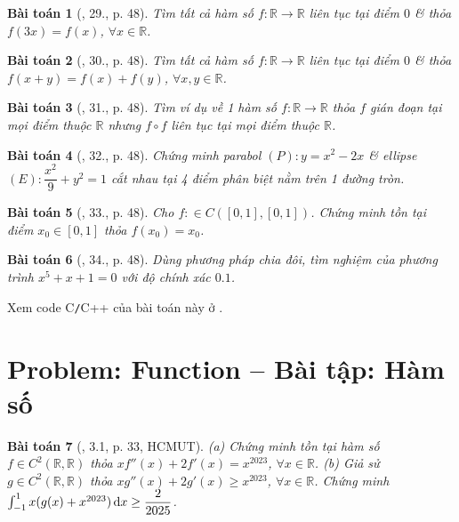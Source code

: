 \documentclass[oneside]{book}
\newtheorem{baitoan}{Bài toán}
\begin{document}
\begin{baitoan}[\cite{TLCT_BT_dai_so_giai_tich_11}, 29., p. 48]
	Tìm tất cả hàm số $f:\mathbb{R}\to\mathbb{R}$ liên tục tại điểm $0$ \& thỏa $f(3x) = f(x)$, $\forall x\in\mathbb{R}$.
\end{baitoan}

\begin{baitoan}[\cite{TLCT_BT_dai_so_giai_tich_11}, 30., p. 48]
	Tìm tất cả hàm số $f:\mathbb{R}\to\mathbb{R}$ liên tục tại điểm $0$ \& thỏa $f(x + y) = f(x) + f(y) $, $\forall x,y\in\mathbb{R}$.
\end{baitoan}

\begin{baitoan}[\cite{TLCT_BT_dai_so_giai_tich_11}, 31., p. 48]
	Tìm ví dụ về 1 hàm số $f:\mathbb{R}\to\mathbb{R}$ thỏa $f$ gián đoạn tại mọi điểm thuộc $\mathbb{R}$ nhưng $f\circ f$ liên tục tại mọi điểm thuộc $\mathbb{R}$.
\end{baitoan}

\begin{baitoan}[\cite{TLCT_BT_dai_so_giai_tich_11}, 32., p. 48]
	Chứng minh parabol $(P):y = x^2 - 2x$ \& ellipse $(E):\dfrac{x^2}{9} + y^2 = 1$ cắt nhau tại 4 điểm phân biệt nằm trên 1 đường tròn.
\end{baitoan}

\begin{baitoan}[\cite{TLCT_BT_dai_so_giai_tich_11}, 33., p. 48]
	Cho $f:\in C([0,1],[0,1])$. Chứng minh tồn tại điểm $x_0\in[0,1]$ thỏa $f(x_0) = x_0$.
\end{baitoan}

\begin{baitoan}[\cite{TLCT_BT_dai_so_giai_tich_11}, 34., p. 48]
	Dùng phương pháp chia đôi, tìm nghiệm của phương trình $x^5 + x + 1 = 0$ với độ chính xác $0.1$.
\end{baitoan}
Xem code C{\tt/}C++ của bài toán này ở \cite{Thu_Phuong_Tien_Triet_NMLT}.


\section{Problem: Function -- Bài tập: Hàm số}

\begin{baitoan}[\cite{VMS_VMC2023}, 3.1, p. 33, HCMUT]
	(a) Chứng minh tồn tại hàm số $f\in C^2(\mathbb{R},\mathbb{R})$ thỏa $xf''(x) + 2f'(x) = x^{2023}$, $\forall x\in\mathbb{R}$. (b) Giả sử $g\in C^2(\mathbb{R},\mathbb{R})$ thỏa $xg''(x) + 2g'(x)\ge x^{2023}$, $\forall x\in\mathbb{R}$. Chứng minh $\int_{-1}^1 x(g(x) + x^{2023})\,{\rm d}x\ge\dfrac{2}{2025}$.
\end{baitoan}
\end{document}
